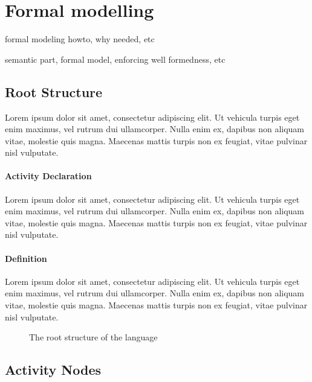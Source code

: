 \clearpage\section{Formal modelling}

formal modeling howto, why needed, etc

semantic part, formal model, enforcing well formedness, etc

\subsection{Root Structure}

Lorem ipsum dolor sit amet, consectetur adipiscing elit. Ut vehicula turpis eget enim maximus, vel rutrum dui ullamcorper. Nulla enim ex, dapibus non aliquam vitae, molestie quis magna. Maecenas mattis turpis non ex feugiat, vitae pulvinar nisl vulputate.

\paragraph{Activity Declaration}

Lorem ipsum dolor sit amet, consectetur adipiscing elit. Ut vehicula turpis eget enim maximus, vel rutrum dui ullamcorper. Nulla enim ex, dapibus non aliquam vitae, molestie quis magna. Maecenas mattis turpis non ex feugiat, vitae pulvinar nisl vulputate.

\paragraph{Definition}

Lorem ipsum dolor sit amet, consectetur adipiscing elit. Ut vehicula turpis eget enim maximus, vel rutrum dui ullamcorper. Nulla enim ex, dapibus non aliquam vitae, molestie quis magna. Maecenas mattis turpis non ex feugiat, vitae pulvinar nisl vulputate.

\begin{figure}[!ht]
	\centering
	
	\caption{The root structure of the language}
	\label{fig:declaration}
\end{figure}

\subsection{Activity Nodes}

